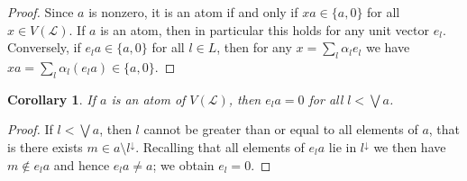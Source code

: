 \documentclass[a4paper, 11pt]{article}
\theoremstyle{plain}
\newtheorem{corollary}  [theorem]{Corollary}
\theoremstyle{definition}
\newcommand{\bigjoin}   {\bigvee}
\begin{document}
\begin{proof}
Since $a$ is nonzero, it is an atom if and only if $x a \in \{ a, 0 \}$ for all $x \in V( \mathcal{L} )$. If $a$ is an atom, then in particular this holds for any unit vector $e_l$. Conversely, if $e_l a \in \{a, 0\}$ for all $l \in L$, then for any $x = \sum_l \alpha_l e_l$ we have $xa = \sum_l \alpha_l (e_la) \in \{ a, 0 \}$.
\end{proof}

\begin{corollary} \label{corollary:ela=0}
If $a$ is an atom of $V( \mathcal{L} )$, then $e_l a = 0$ for all $l < \bigjoin a$.
\end{corollary}

\begin{proof}
If $l < \bigjoin a$, then $l$ cannot be greater than or equal to all elements of $a$, that is there exists $m \in a \setminus l^\downarrow$. Recalling that all elements of $e_la$ lie in $l^\downarrow$ we then have $m \notin e_l a$ and hence $e_l a \ne a$; we obtain $e_l = 0$.
\end{proof}
\end{document}
